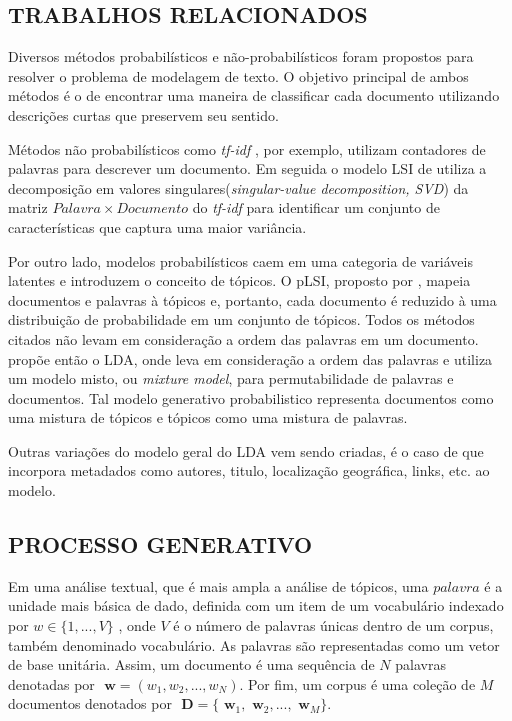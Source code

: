 \documentclass[12pt,a4paper]{article}
\begin{document}

\subsection{TRABALHOS RELACIONADOS} \label{sec:trabalhos-relacionados}

Diversos métodos probabilísticos e não-probabilísticos foram propostos para resolver o problema de modelagem de texto. O objetivo
 principal de ambos métodos é o de encontrar uma maneira de classificar cada documento utilizando descrições curtas que preservem
 seu sentido.

Métodos não probabilísticos como \textit{tf-idf} \cite{salton1983introduction}, por exemplo, utilizam contadores de palavras para descrever um documento.
 Em seguida o modelo LSI de  utiliza a decomposição em valores singulares(\textit{singular-value decomposition, SVD}) da
 matriz $Palavra \times Documento$ do \textit{tf-idf} para identificar um conjunto de características que captura uma maior variância.

Por outro lado, modelos probabilísticos caem em uma categoria de variáveis latentes e introduzem o conceito de tópicos. O pLSI, proposto por , 
 mapeia documentos e palavras à tópicos e, portanto, cada documento é reduzido à uma distribuição de probabilidade em um conjunto de tópicos.
 Todos os métodos citados não levam em consideração a ordem das palavras em um documento.  propõe então o
 LDA, onde leva em consideração a ordem das palavras e utiliza um modelo misto, ou \textit{mixture model}, para permutabilidade de palavras e documentos. Tal
 modelo generativo probabilistico representa documentos como uma mistura de tópicos e tópicos como uma mistura de palavras.

Outras variações do modelo geral do LDA vem sendo criadas, é o caso de 
 que incorpora metadados como autores, titulo, localização geográfica, links, etc. ao modelo.
\subsection{PROCESSO GENERATIVO} \label{sec:processo-generativo}

Em uma análise textual, que é mais ampla a análise de  tópicos, uma $palavra$ é a unidade mais básica de dado, definida com um item de um vocabulário indexado por \(w \in \{1,. . . , V\}\)  , onde $V$ é o número de palavras únicas dentro de um corpus, também denominado vocabulário. As palavras são representadas como um vetor de base unitária. Assim, um documento é uma sequência de $N$ palavras denotadas por \(\textbf{ w} = (w_1, w_2,. . . ,  w_N)\). Por fim, um corpus é uma coleção de $M$ documentos denotados por \(\textbf{ D} = \{\textbf{ w}_1, \textbf{ w}_2, . . ., \textbf{ w}_M\}\).
\end{document}
